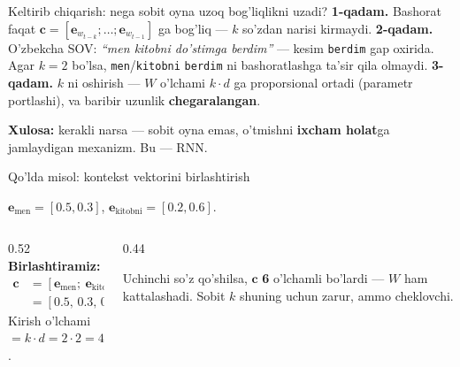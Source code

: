 \documentclass[aspectratio=169,11pt]{beamer}
\begin{document}
\begin{frame}{Keltirib chiqarish: nega sobit oyna uzoq bog'liqlikni uzadi?}
  \textbf{1-qadam.} Bashorat faqat $\mathbf{c}=[\mathbf{e}_{w_{t-k}};\ldots;\mathbf{e}_{w_{t-1}}]$
  ga bog'liq --- $k$ so'zdan narisi kirmaydi.
  \pause
  \textbf{2-qadam.} O'zbekcha SOV: \textit{``men kitobni do'stimga berdim''} ---
  kesim \texttt{berdim} gap oxirida. Agar $k=2$ bo'lsa, \texttt{men}/\texttt{kitobni}
  \texttt{berdim} ni bashoratlashga ta'sir qila olmaydi.
  \pause
  \textbf{3-qadam.} $k$ ni oshirish --- $W$ o'lchami $k\cdot d$ ga proporsional ortadi
  (parametr portlashi), va baribir uzunlik \textbf{chegaralangan}.
  \begin{tcolorbox}[okbox,top=2pt,bottom=2pt]
    \small \textbf{Xulosa:} kerakli narsa --- sobit oyna emas, o'tmishni
    \textbf{ixcham holat}ga jamlaydigan mexanizm. Bu --- RNN.
  \end{tcolorbox}
\end{frame}

\begin{frame}{Qo'lda misol: kontekst vektorini birlashtirish}
  \begin{tcolorbox}[defbox,title={Oyna k=2, embedding o'lchami d=2}]
    \small
    $\mathbf{e}_{\text{men}}=[0.5,0.3]$, \quad $\mathbf{e}_{\text{kitobni}}=[0.2,0.6]$.
  \end{tcolorbox}
  \vspace{0.2em}
  \begin{columns}[T]
    \begin{column}{0.52\textwidth}
      \textbf{Birlashtiramiz:}
      \begin{align*}
        \mathbf{c} &= [\mathbf{e}_{\text{men}};\ \mathbf{e}_{\text{kitobni}}]\\
          &= [0.5,\,0.3,\,0.2,\,0.6]
      \end{align*}
      Kirish o'lchami $= k\cdot d = 2\cdot 2 = 4$.
    \end{column}
    \begin{column}{0.44\textwidth}
      \begin{tcolorbox}[okbox,top=2pt,bottom=2pt]
        \footnotesize
        Uchinchi so'z qo'shilsa, $\mathbf{c}$ \textbf{6} o'lchamli bo'lardi ---
        $W$ ham kattalashadi. Sobit $k$ shuning uchun zarur, ammo cheklovchi.
      \end{tcolorbox}
    \end{column}
  \end{columns}
\end{frame}
\end{document}

